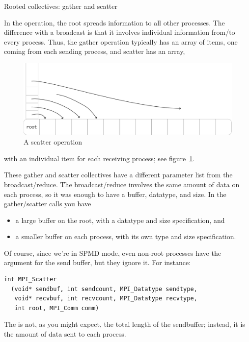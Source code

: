 
 {Rooted collectives: gather and scatter}
\label{sec:gatherscatter}

In the  operation, the root spreads information to
all other processes. The difference with a broadcast is that it involves
individual information from/to every process. Thus, the gather operation typically 
has an array of items, one coming from each sending process, and scatter has an array,
\begin{figure}[ht]
  \includegraphics[scale=.12]{graphics/scatter-simple}
  \caption{A scatter operation}
  \label{fig:scatter}
\end{figure}
with an individual item for each receiving process; see figure~\ref{fig:scatter}.

These gather and scatter collectives have a different parameter list from
the broadcast/reduce. The broadcast/reduce involves the same amount
of data on each process, so it was enough to have a buffer, datatype, and size.
In the gather/scatter calls you have
\begin{itemize}
\item a large buffer on the root, with a datatype and size specification, and
\item a smaller buffer on each process, with its own type and size specification.
\end{itemize}
Of course, since we're in SPMD mode, even non-root processes have
the argument for the send buffer, but they ignore it. For instance:
\begin{lstlisting}
int MPI_Scatter
  (void* sendbuf, int sendcount, MPI_Datatype sendtype, 
   void* recvbuf, int recvcount, MPI_Datatype recvtype, 
   int root, MPI_Comm comm) 
\end{lstlisting}
The  is not, as you might expect, the total length of the
sendbuffer; instead, it is the amount of data sent to each process.

